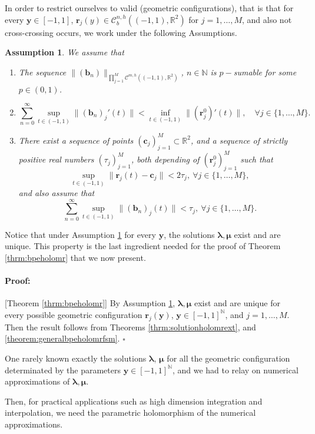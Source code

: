 \documentclass{article}
\newtheorem{assumption}[theorem]{Assumption}
\newenvironment{proof}{\paragraph{Proof:}}{\hfill$\square$}
\newcommand{\bmu} {\bm{\mu}}
\newcommand{\IN}{{\mathbb N}}
\newcommand{\IR}{{\mathbb R}}
\newcommand{\IU}{{\mathbb U}}
\newcommand{\IT}{{\mathbb T}}
\newcommand{\IW}{{\mathbb W}}
\newcommand{\IY}{{\mathbb Y}}
\newcommand{\cmspaceh}[4]{\mathcal{C}^{#1,#2} \left( #3, #4 \right)}
\newcommand{\rgeoh}[2]{\mathcal{C}_b^{#1,#2}\left( (-1,1), \IR^2 \right)}
\newcommand{\bla}{\boldsymbol \lambda}
\newcommand{\bc}{\bm{c}}
\newcommand{\br}{\bm{r}}
\newcommand{\by}{\bm{y}}
\newcommand{\bb}{\bm{b}}
\begin{document}
In order to restrict ourselves to valid (geometric configurations), that is that for every $\by \in [-1,1]$, $\br_j(y) \in \rgeoh{n}{h}$ for $j=1,\hdots,M$, and also not cross-crossing occurs, we work under the following Assumptions. 
\begin{assumption}
\label{assump:geoparam}
We assume that
\begin{enumerate}
\item 
The sequence $\|(\bb_n)\|_{\prod_{j=1}^M\cmspaceh{m}{h}{(-1,1)}{\IR^2}}$, $n\in \IN$ is $p-$sumable for some $p \in (0,1)$.
\item 
$$\sum_{n=0}^\infty \sup_{t \in (-1,1)} \| ( \bb_n)_j'(t)\| < \inf_{t \in (-1,1)}\|(\br^0_j)'(t)\|,\quad \forall
j \in \{1,\hdots,M\}.
$$
\item
There exist a sequence of points $(\bc_j)_{j=1}^M \subset \IR^2$, and a sequence of strictly positive real numbers $(\tau_j)_{j=1}^M $, both depending of $(\br_j^0)_{j=1}^M$ such that 
$$\sup_{t\in(-1,1)} \| \br_j(t) - \bc_j \| < 2\tau_j,\ \forall j \in \{1,\hdots,M\},$$
and also assume that 
$$
\sum_{n=0}^\infty \sup_{t \in (-1,1)} \| (\bb_n)_j(t)\| <  \tau_j,\ \forall j \in \{1,\hdots,M\}.
$$
\end{enumerate}
\end{assumption}
Notice that under Assumption \ref{assump:geoparam} for every $\by$, the solutions $\bla,\bmu$ exist and are unique. This property is the last ingredient needed for the proof of Theorem \ref{thrm:bpeholomr} that we now present. 
\begin{proof}[Theorem \ref{thrm:bpeholomr}]
By Assumption \ref{assump:geoparam}, $\bla,\bmu$ exist and are unique for every possible geometric configuration $\br_j(\by)$, $\by \in [-1,1]^\IN$, and $j = 1,\hdots,M$.  Then the result follows from Theorems \ref{thrm:solutionholomrext}, and \ref{theorem:generalbpeholomrfsm}.
\end{proof}

One rarely known exactly the solutions $\bla$, $\bmu$ for all the geometric configuration determinated by the parameters $\by \in [-1,1]^\IN$, and we had to relay on numerical approximations of $\bla,\bmu$.

Then, for practical applications such as high dimension integration and interpolation, we need the parametric holomorphism of the numerical approximations. 

\end{document}
